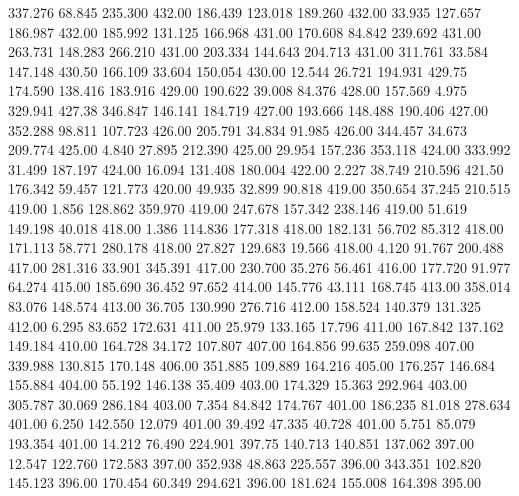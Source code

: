  337.276   68.845  235.300       432.00
 186.439  123.018  189.260       432.00
  33.935  127.657  186.987       432.00
 185.992  131.125  166.968       431.00
 170.608   84.842  239.692       431.00
 263.731  148.283  266.210       431.00
 203.334  144.643  204.713       431.00
 311.761   33.584  147.148       430.50
 166.109   33.604  150.054       430.00
  12.544   26.721  194.931       429.75
 174.590  138.416  183.916       429.00
 190.622   39.008   84.376       428.00
 157.569    4.975  329.941       427.38
 346.847  146.141  184.719       427.00
 193.666  148.488  190.406       427.00
 352.288   98.811  107.723       426.00
 205.791   34.834   91.985       426.00
 344.457   34.673  209.774       425.00
   4.840   27.895  212.390       425.00
  29.954  157.236  353.118       424.00
 333.992   31.499  187.197       424.00
  16.094  131.408  180.004       422.00
   2.227   38.749  210.596       421.50
 176.342   59.457  121.773       420.00
  49.935   32.899   90.818       419.00
 350.654   37.245  210.515       419.00
   1.856  128.862  359.970       419.00
 247.678  157.342  238.146       419.00
  51.619  149.198   40.018       418.00
   1.386  114.836  177.318       418.00
 182.131   56.702   85.312       418.00
 171.113   58.771  280.178       418.00
  27.827  129.683   19.566       418.00
   4.120   91.767  200.488       417.00
 281.316   33.901  345.391       417.00
 230.700   35.276   56.461       416.00
 177.720   91.977   64.274       415.00
 185.690   36.452   97.652       414.00
 145.776   43.111  168.745       413.00
 358.014   83.076  148.574       413.00
  36.705  130.990  276.716       412.00
 158.524  140.379  131.325       412.00
   6.295   83.652  172.631       411.00
  25.979  133.165   17.796       411.00
 167.842  137.162  149.184       410.00
 164.728   34.172  107.807       407.00
 164.856   99.635  259.098       407.00
 339.988  130.815  170.148       406.00
 351.885  109.889  164.216       405.00
 176.257  146.684  155.884       404.00
  55.192  146.138   35.409       403.00
 174.329   15.363  292.964       403.00
 305.787   30.069  286.184       403.00
   7.354   84.842  174.767       401.00
 186.235   81.018  278.634       401.00
   6.250  142.550   12.079       401.00
  39.492   47.335   40.728       401.00
   5.751   85.079  193.354       401.00
  14.212   76.490  224.901       397.75
 140.713  140.851  137.062       397.00
  12.547  122.760  172.583       397.00
 352.938   48.863  225.557       396.00
 343.351  102.820  145.123       396.00
 170.454   60.349  294.621       396.00
 181.624  155.008  164.398       395.00
